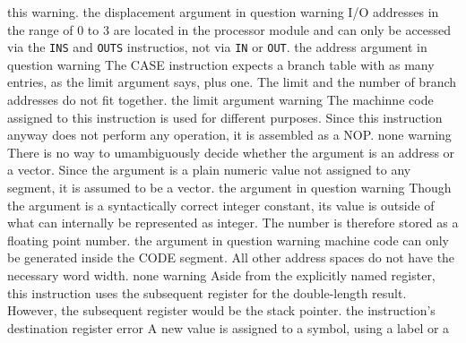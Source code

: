 \documentclass[12pt,twoside]{report}
\begin{document}
\begin{description}
{                this warning.}
               {the displacement argument in question}
               {warning}
               {I/O addresses in the range of 0 to 3 are located in the
                processor module and can only be accessed via the {\tt INS}
                and {\tt OUTS} instructios, not via {\tt IN} or {\tt OUT}.}
               {the address argument in question}
               {warning}
               {The CASE instruction expects a branch table with as many
                entries, as the limit argument says, plus one.  The limit and
                the number of branch addresses do not fit together.}
               {the limit argument}
               {warning}
               {The machinne code assigned to this instruction is used
                for different purposes.  Since this instruction anyway does
                not perform any operation, it is assembled as a NOP.}
               {none}
               {warning}
               {There is no way to umambiguously decide whether the argument is
                an address or a vector.  Since the argument is a plain numeric
                value not assigned to any segment, it is assumed to be a vector.}
               {the argument in question}
               {warning}
               {Though the argument is a syntactically correct integer constant,
                its value is outside of what can internally be represented as
                integer.  The number is therefore stored as a floating point
                number.}
               {the argument in question}
               {warning}
               {machine code can only be generated inside the CODE segment. All
                other address spaces do not have the necessary word width.}
               {none}
               {warning}
               {Aside from the explicitly named register, this instruction
                uses the subsequent register for the double-length result.
                However, the subsequent register would be the stack pointer.}
               {the instruction's destination register}
               {error}
               {A new value is assigned to a symbol, using a label or a
}
\end{description}
\end{document}
